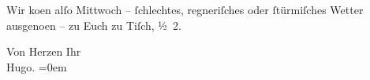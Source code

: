 \pstart
           Wir ko{\geminationm}en alſo Mittwoch –{ }ſchlechtes,
               regneriſches oder{ }ſtürmiſches Wetter ausgeno{\geminationm}en – zu
               Euch zu Tiſch, ½ 2.\pend
           
\pstart
           Von Herzen Ihr{\\[\baselineskip]}\spacefill\mbox{Hugo.}\pend
           \leftskip=0em{}\endnumbering{}  \newcommand{\dateiname}{L01408}\newcommand{\titel}{Hugo von Hofmannsthal an Arthur Schnitzler, 20. 6. 1904}\newcommand{\editorInnen}{Martin Anton Müller und Gerd-Hermann Susen}
